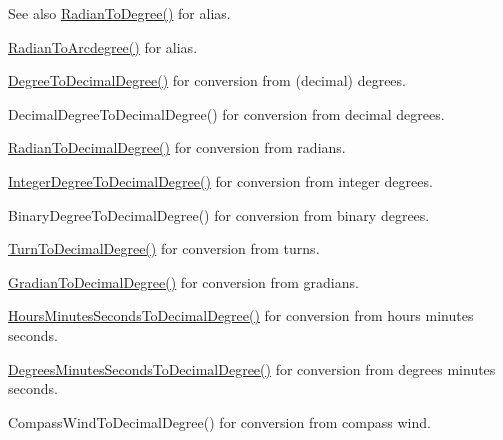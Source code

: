 \begin{DoxySeeAlso}{See also}
\mbox{\hyperlink{group___e_g_x_math-_angle_conversions-_radian_ga25bbce6cdc1c3621f2a158d320e3bc45}{Radian\+To\+Degree()}} for alias. 

\mbox{\hyperlink{group___e_g_x_math-_angle_conversions-_radian_ga3dfdc97357cc07f8379976bbc08f9852}{Radian\+To\+Arcdegree()}} for alias. 

\mbox{\hyperlink{group___e_g_x_math-_angle_conversions-_degree_ga568afc1d436d425bf5d4edea584aee08}{Degree\+To\+Decimal\+Degree()}} for conversion from (decimal) degrees. 

Decimal\+Degree\+To\+Decimal\+Degree() for conversion from decimal degrees. 

\mbox{\hyperlink{group___e_g_x_math-_angle_conversions-_radian_ga6d170f1882c32de53167c04524d05f67}{Radian\+To\+Decimal\+Degree()}} for conversion from radians. 

\mbox{\hyperlink{group___e_g_x_math-_angle_conversions-_integer_degree_gac219c3198508ba984d8d81d22831b27d}{Integer\+Degree\+To\+Decimal\+Degree()}} for conversion from integer degrees. 

Binary\+Degree\+To\+Decimal\+Degree() for conversion from binary degrees. 

\mbox{\hyperlink{group___e_g_x_math-_angle_conversions-_turn_ga79231536255e77fb7a158b99a30c1767}{Turn\+To\+Decimal\+Degree()}} for conversion from turns. 

\mbox{\hyperlink{group___e_g_x_math-_angle_conversions-_gradian_ga346f47c519d5261b689cec49f4a8e789}{Gradian\+To\+Decimal\+Degree()}} for conversion from gradians. 

\mbox{\hyperlink{group___e_g_x_math-_angle_conversions-_hours_minutes_seconds_gad6662d1113ae8aea6baca6317888b4cd}{Hours\+Minutes\+Seconds\+To\+Decimal\+Degree()}} for conversion from hours minutes seconds. 

\mbox{\hyperlink{group___e_g_x_math-_angle_conversions-_degrees_minutes_seconds_gab4d4c25623f86611692c39eb29f16141}{Degrees\+Minutes\+Seconds\+To\+Decimal\+Degree()}} for conversion from degrees minutes seconds. 

Compass\+Wind\+To\+Decimal\+Degree() for conversion from compass wind. 
\end{DoxySeeAlso}
\mbox{\label{group___e_g_x_math-_angle_conversions-_radian_ga25bbce6cdc1c3621f2a158d320e3bc45}} 
